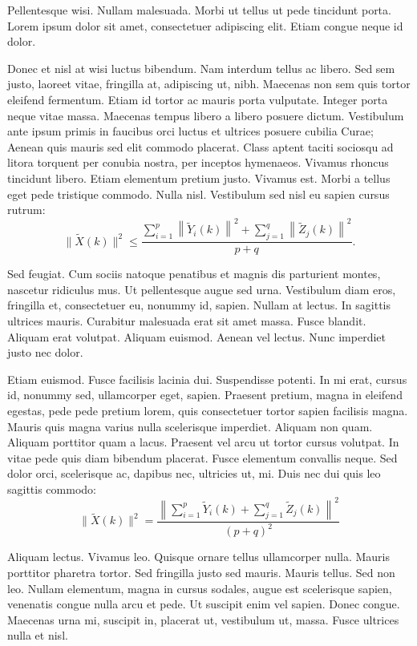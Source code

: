 \documentclass[CJCE,STIX2COL]{WileyNJD-v2}
\begin{document}
Pellentesque wisi. Nullam malesuada. Morbi ut tellus ut pede tincidunt porta. Lorem ipsum dolor sit amet,
consectetuer adipiscing elit. Etiam congue neque id dolor.

Donec et nisl at wisi luctus bibendum. Nam interdum tellus ac libero. Sed sem justo, laoreet vitae, fringilla at,
adipiscing ut, nibh. Maecenas non sem quis tortor eleifend fermentum. Etiam id tortor ac mauris porta vulputate.
Integer porta neque vitae massa. Maecenas tempus libero a libero posuere dictum. Vestibulum ante ipsum primis in
faucibus orci luctus et ultrices posuere cubilia Curae; Aenean quis mauris sed elit commodo placerat. Class aptent
taciti sociosqu ad litora torquent per conubia nostra, per inceptos hymenaeos. Vivamus rhoncus tincidunt libero.
Etiam elementum pretium justo. Vivamus est. Morbi a tellus eget pede tristique commodo. Nulla nisl. Vestibulum
sed nisl eu sapien cursus rutrum:
\begin{equation}\label{eq23}
 \|\tilde{X}(k)\|^2
 \leq\frac{\sum\limits_{i=1}^{p}\left\|\tilde{Y}_i(k)\right\|^2+\sum\limits_{j=1}^{q}\left\|\tilde{Z}_j(k)\right\|^2 }{p+q}.
\end{equation}

Sed feugiat. Cum sociis natoque penatibus et magnis dis parturient montes, nascetur ridiculus mus. Ut pellentesque
augue sed urna. Vestibulum diam eros, fringilla et, consectetuer eu, nonummy id, sapien. Nullam at lectus. In sagittis
ultrices mauris. Curabitur malesuada erat sit amet massa. Fusce blandit. Aliquam erat volutpat. Aliquam euismod.
Aenean vel lectus. Nunc imperdiet justo nec dolor.

Etiam euismod. Fusce facilisis lacinia dui. Suspendisse potenti. In mi erat, cursus id, nonummy sed, ullamcorper
eget, sapien. Praesent pretium, magna in eleifend egestas, pede pede pretium lorem, quis consectetuer tortor sapien
facilisis magna. Mauris quis magna varius nulla scelerisque imperdiet. Aliquam non quam. Aliquam porttitor quam
a lacus. Praesent vel arcu ut tortor cursus volutpat. In vitae pede quis diam bibendum placerat. Fusce elementum
convallis neque. Sed dolor orci, scelerisque ac, dapibus nec, ultricies ut, mi. Duis nec dui quis leo sagittis commodo:
\begin{equation}\label{eq24}
 \|\tilde{X}(k)\|^2
 =\frac{\left\|\sum\limits_{i=1}^{p}\tilde{Y}_i(k)+\sum\limits_{j=1}^{q}\tilde{Z}_j(k) \right\|^2}{(p+q)^2}
\end{equation}

Aliquam lectus. Vivamus leo. Quisque ornare tellus ullamcorper nulla. Mauris porttitor pharetra
tortor. Sed fringilla justo sed mauris. Mauris tellus. Sed non leo. Nullam elementum, magna in cursus sodales, augue
est scelerisque sapien, venenatis congue nulla arcu et pede. Ut suscipit enim vel sapien. Donec congue. Maecenas
urna mi, suscipit in, placerat ut, vestibulum ut, massa. Fusce ultrices nulla et nisl.
\end{document}
